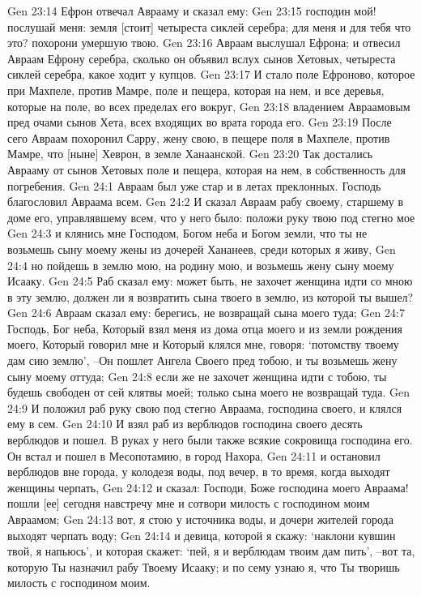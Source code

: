 Gen 23:14  Ефрон отвечал Аврааму и сказал ему:
Gen 23:15  господин мой! послушай меня: земля [стоит] четыреста сиклей серебра; для меня и для тебя что это? похорони умершую твою.
Gen 23:16  Авраам выслушал Ефрона; и отвесил Авраам Ефрону серебра, сколько он объявил вслух сынов Хетовых, четыреста сиклей серебра, какое ходит у купцов.
Gen 23:17  И стало поле Ефроново, которое при Махпеле, против Мамре, поле и пещера, которая на нем, и все деревья, которые на поле, во всех пределах его вокруг,
Gen 23:18  владением Авраамовым пред очами сынов Хета, всех входящих во врата города его.
Gen 23:19  После сего Авраам похоронил Сарру, жену свою, в пещере поля в Махпеле, против Мамре, что [ныне] Хеврон, в земле Ханаанской.
Gen 23:20  Так достались Аврааму от сынов Хетовых поле и пещера, которая на нем, в собственность для погребения.
Gen 24:1  Авраам был уже стар и в летах преклонных. Господь благословил Авраама всем.
Gen 24:2  И сказал Авраам рабу своему, старшему в доме его, управлявшему всем, что у него было: положи руку твою под стегно мое
Gen 24:3  и клянись мне Господом, Богом неба и Богом земли, что ты не возьмешь сыну моему жены из дочерей Хананеев, среди которых я живу,
Gen 24:4  но пойдешь в землю мою, на родину мою, и возьмешь жену сыну моему Исааку.
Gen 24:5  Раб сказал ему: может быть, не захочет женщина идти со мною в эту землю, должен ли я возвратить сына твоего в землю, из которой ты вышел?
Gen 24:6  Авраам сказал ему: берегись, не возвращай сына моего туда;
Gen 24:7  Господь, Бог неба, Который взял меня из дома отца моего и из земли рождения моего, Который говорил мне и Который клялся мне, говоря: `потомству твоему дам сию землю', --Он пошлет Ангела Своего пред тобою, и ты возьмешь жену сыну моему оттуда;
Gen 24:8  если же не захочет женщина идти с тобою, ты будешь свободен от сей клятвы моей; только сына моего не возвращай туда.
Gen 24:9  И положил раб руку свою под стегно Авраама, господина своего, и клялся ему в сем.
Gen 24:10  И взял раб из верблюдов господина своего десять верблюдов и пошел. В руках у него были также всякие сокровища господина его. Он встал и пошел в Месопотамию, в город Нахора,
Gen 24:11  и остановил верблюдов вне города, у колодезя воды, под вечер, в то время, когда выходят женщины черпать,
Gen 24:12  и сказал: Господи, Боже господина моего Авраама! пошли [ее] сегодня навстречу мне и сотвори милость с господином моим Авраамом;
Gen 24:13  вот, я стою у источника воды, и дочери жителей города выходят черпать воду;
Gen 24:14  и девица, которой я скажу: `наклони кувшин твой, я напьюсь', и которая скажет: `пей, я и верблюдам твоим дам пить', --вот та, которую Ты назначил рабу Твоему Исааку; и по сему узнаю я, что Ты творишь милость с господином моим.
